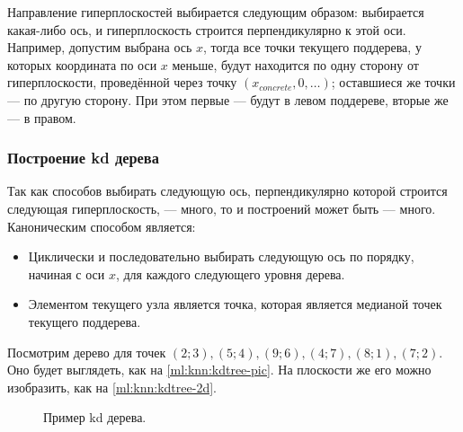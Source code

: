 Направление гиперплоскостей выбирается следующим образом: выбирается какая-либо ось, и гиперплоскость строится перпендикулярно к этой оси. Например, допустим выбрана ось $x$, тогда все точки текущего поддерева, у которых координата по оси $x$ меньше, будут находится по одну сторону от гиперплоскости, проведённой через точку $(x_{concrete}, 0, \dots)$; оставшиеся же точки — по другую сторону. При этом первые — будут в левом поддереве, вторые же — в правом.

\subsubsection{Построение kd дерева}
Так как способов выбирать следующую ось, перпендикулярно которой строится следующая гиперплоскость, — много, то и построений может быть — много. Каноническим способом является:
\begin{itemize}
  \item Циклически и последовательно выбирать следующую ось по порядку, начиная с оси $x$, для каждого следующего уровня дерева.
  \item Элементом текущего узла является точка, которая является медианой точек текущего поддерева.
\end{itemize}

Посмотрим дерево для точек $(2; 3), (5; 4), (9; 6), (4; 7), (8; 1), (7; 2)$. Оно будет выглядеть, как на \autoref{ml:knn:kdtree-pic}. На плоскости же его можно изобразить, как на \autoref{ml:knn:kdtree-2d}.

\begin{figure}[htb]
  \centering
  \caption{Пример kd дерева.}
  \label{ml:knn:kdtree-pic}
\end{figure}

